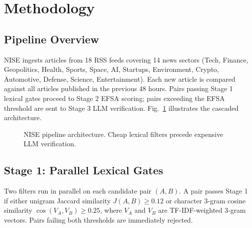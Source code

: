 \documentclass[conference]{IEEEtran}
\begin{document}
\section{Methodology}

\subsection{Pipeline Overview}
NISE ingests articles from 18 RSS feeds covering 14 news sectors (Tech, Finance, Geopolitics, Health, Sports, Space, AI, Startups, Environment, Crypto, Automotive, Defense, Science, Entertainment).
Each new article is compared against all articles published in the previous 48 hours.
Pairs passing Stage 1 lexical gates proceed to Stage 2 EFSA scoring; pairs exceeding the EFSA threshold are sent to Stage 3 LLM verification.
Fig.~\ref{fig:architecture} illustrates the cascaded architecture.

\begin{figure}[!t]
    \centering
    \caption{NISE pipeline architecture. Cheap lexical filters precede expensive LLM verification.}
    \label{fig:architecture}
\end{figure}

\subsection{Stage 1: Parallel Lexical Gates}
Two filters run in parallel on each candidate pair $(A, B)$.
A pair passes Stage 1 if either unigram Jaccard similarity $J(A,B) \ge 0.12$ or character 3-gram cosine similarity $\cos(V_A, V_B) \ge 0.25$, where $V_A$ and $V_B$ are TF-IDF-weighted 3-gram vectors.
Pairs failing both thresholds are immediately rejected.
\end{document}
